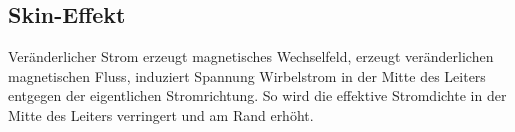 \documentclass[10pt,a4paper]{scrartcl}
\begin{document}
\begin{multicols*}{3}
	
	\subsection{Skin-Effekt}
	
	Veränderlicher Strom erzeugt magnetisches Wechselfeld, erzeugt veränderlichen magnetischen Fluss, induziert Spannung \dahe Wirbelstrom in der Mitte des Leiters entgegen der eigentlichen Stromrichtung. So wird die effektive Stromdichte in der Mitte des Leiters verringert und am Rand erhöht.
	
	
	
	
	
	
		
\end{multicols*}
\end{document}
